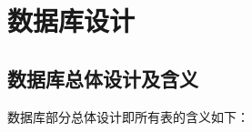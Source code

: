 
    \section{数据库设计}

        \subsection{数据库总体设计及含义}
            数据库部分总体设计即所有表的含义如下：

            \begin{enumerate}
                

\end{enumerate}
